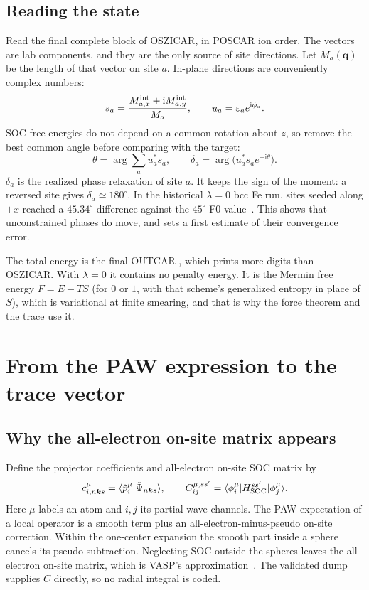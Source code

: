 \documentclass[11pt,a4paper]{article}
\numberwithin{equation}{section}
\newcommand{\vct}[1]{\bm{#1}}
\newcommand{\qh}{\vct q}
\newcommand{\kh}{\vct k}
\newcommand{\ii}{\mathrm i}
\newcommand{\code}[1]{\texttt{\detokenize{#1}}}
\begin{document}
\subsection{Reading the state}

Read the final complete \code{M_int} block of OSZICAR, in POSCAR ion order.
The vectors are lab components, and they are the only source of site directions.
Let $M_a(\qh)$ be the length of that vector on site $a$. In-plane directions
are conveniently complex numbers:
\begin{equation}\label{eq:complex}
 s_a=\frac{M^{\rm int}_{a,x}+\ii M^{\rm int}_{a,y}}{M_a},
 \qquad u_a=\varepsilon_ae^{\ii\phi_a}.
\end{equation}
SOC-free energies do not depend on a common rotation about $z$, so remove the
best common angle before comparing with the target:
\begin{equation}\label{eq:delta}
 \theta=\arg\sum_a u_a^*s_a,\qquad
 \delta_a=\arg\bigl(u_a^*s_ae^{-\ii\theta}\bigr).
\end{equation}
$\delta_a$ is the realized phase relaxation of site $a$. It keeps the sign of
the moment: a reversed site gives $\delta_a\simeq180^\circ$. In the historical
$\lambda=0$ bcc Fe run, sites seeded along $+x$ reached a $45.34^\circ$
difference against the $45^\circ$ F0 value~\cite{fetest}. This shows that
unconstrained phases do move, and sets a first estimate of their convergence
error.

The total energy is the final OUTCAR \code{free  energy   TOTEN}, which prints
more digits than OSZICAR. With $\lambda=0$ it contains no penalty energy.
It is the Mermin free energy $F=E-TS$ (for \code{ISMEAR} $0$ or $1$, with that
scheme's generalized entropy in place of $S$), which is variational at finite
smearing, and that is why the force theorem and the trace use it.

\section{From the PAW expression to the trace vector}\label{sec:paw}

\subsection{Why the all-electron on-site matrix appears}

Define the projector coefficients and all-electron on-site SOC matrix by
\begin{equation}\label{eq:pawobjects}
 c^\mu_{i,n\kh s}=
 \langle\tilde p_i^\mu|\tilde\Psi_{n\kh s}\rangle,\qquad
 C^{\mu,ss'}_{ij}=
 \langle\phi_i^\mu|H_{\rm SOC}^{ss'}|\phi_j^\mu\rangle.
\end{equation}
Here $\mu$ labels an atom and $i,j$ its partial-wave channels. The PAW
expectation of a local operator is a smooth term plus an
all-electron-minus-pseudo on-site correction. Within the one-center expansion
the smooth part inside a sphere cancels its pseudo subtraction. Neglecting SOC
outside the spheres leaves the all-electron on-site matrix, which is VASP's
approximation~\cite{lsorbit}. The validated \code{CSO} dump supplies $C$
directly, so no radial integral is coded.
\end{document}
